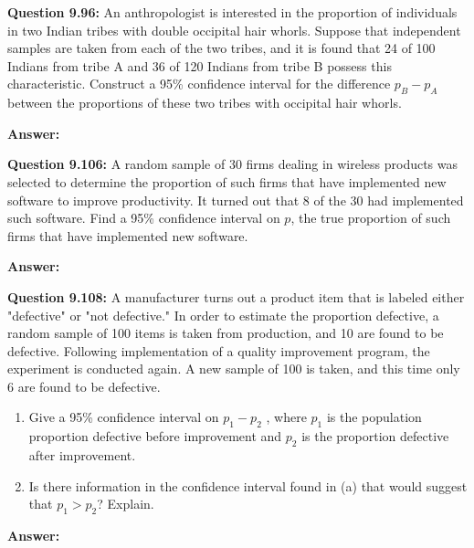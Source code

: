\documentclass{article}
\begin{document}
\textbf{Question 9.96:}
An anthropologist is interested in the proportion
of individuals in two Indian tribes with double 
occipital hair whorls. Suppose that independent samples are
taken from each of the two tribes, and it is found that
24 of 100 Indians from tribe A and 36 of 120 Indians
from tribe B possess this characteristic. Construct a
95\% confidence interval for the difference $p_B − p_A$ 
between the proportions of these two tribes with occipital
hair whorls.
\begin{description}
    \item \textbf{Answer:} 
\end{description}

\textbf{Question 9.106:}
A random sample of 30 firms dealing in wireless
products was selected to determine the proportion of
such firms that have implemented new software to 
improve productivity. It turned out that 8 of the 30 had
implemented such software. Find a 95\% confidence 
interval on $p$, the true proportion of such firms that have
implemented new software.
\begin{description}
    \item \textbf{Answer:} 
\end{description}

\textbf{Question 9.108:}
A manufacturer turns out a product item that
is labeled either "defective" or "not defective." In order
to estimate the proportion defective, a random sample 
of 100 items is taken from production, and 10 are
found to be defective. Following implementation of a
quality improvement program, the experiment is 
conducted again. A new sample of 100 is taken, and this
time only 6 are found to be defective.
\begin{enumerate}[label = (\alph*) ]
    \item Give a 95\% confidence interval on $p_1 − p_2$ , 
    where $p_1$ is the population proportion defective before 
    improvement and $p_2$ is the proportion defective after
    improvement.
    \item Is there information in the confidence interval
    found in (a) that would suggest that $p_1 > p_2$? 
    Explain.
\end{enumerate}
\begin{description}
    \item \textbf{Answer:} 
\end{description}
\end{document}
